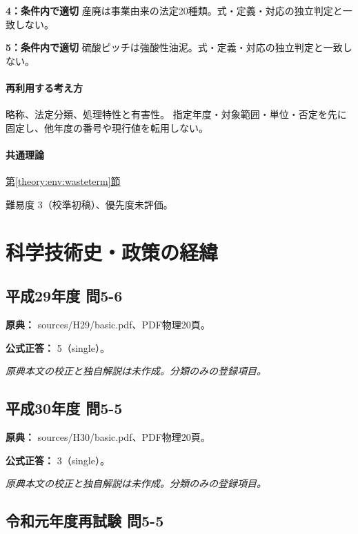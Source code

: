 \noindent\textbf{4：条件内で適切} 産廃は事業由来の法定20種類。式・定義・対応の独立判定と一致しない。\par

\noindent\textbf{5：条件内で適切} 硫酸ピッチは強酸性油泥。式・定義・対応の独立判定と一致しない。\par

\paragraph{再利用する考え方} 略称、法定分類、処理特性と有害性。 指定年度・対象範囲・単位・否定を先に固定し、他年度の番号や現行値を転用しない。

\paragraph{共通理論} \hyperref[theory:env:wasteterm]{第\ref*{theory:env:wasteterm}節}

\par 難易度 3（校準初稿）、優先度未評価。

\section{科学技術史・政策の経緯}

\subsection{平成29年度 問5-6}
\label{q:h29-reg-basic-5-6}

\noindent\textbf{原典：} sources/H29/basic.pdf、PDF物理20頁。

\textbf{公式正答：} 5（single）。

\par\textit{原典本文の校正と独自解説は未作成。分類のみの登録項目。}

\subsection{平成30年度 問5-5}
\label{q:h30-reg-basic-5-5}

\noindent\textbf{原典：} sources/H30/basic.pdf、PDF物理20頁。

\textbf{公式正答：} 3（single）。

\par\textit{原典本文の校正と独自解説は未作成。分類のみの登録項目。}

\subsection{令和元年度再試験 問5-5}
\label{q:r01-ret-basic-5-5}

